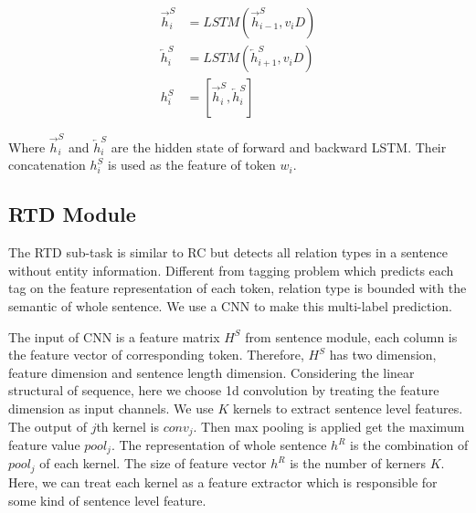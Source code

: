 \begin{align*}
    \overrightarrow{h}_i^S &= LSTM(\overrightarrow{h}_{i-1}^S, v_iD) \nonumber \\
    \overleftarrow{h}_i^S &= LSTM(\overleftarrow{h}_{i+1}^S, v_iD) \nonumber \\
    h_i^S &= [\overrightarrow{h}_i^S, \overleftarrow{h}_i^S] \nonumber
\end{align*}

Where $\overrightarrow{h}_i^S$ and $\overleftarrow{h}_i^S$ are the hidden state
of forward and backward LSTM. Their concatenation $h_i^S$ is used as the feature
of token $w_i$.


%
%
%
%
%
%
%

\subsection{RTD Module}
The RTD sub-task is similar to RC but detects all relation types in a sentence
without entity information. Different from tagging problem which predicts each
tag on the feature representation of each token, relation type is bounded with
the semantic of whole sentence. We use a CNN to make this multi-label
prediction.

The input of CNN is a feature matrix $H^S$ from sentence module, each column is
the feature vector of corresponding token. Therefore, $H^S$ has two dimension, feature
dimension and sentence length dimension. Considering the linear structural of
sequence, here we choose 1d convolution by treating the feature dimension as
input channels. We
use $K$ kernels to extract sentence level features. The output of $j$th kernel
is $conv_j$. Then max pooling is applied  get the maximum feature value
$pool_j$. The representation of whole sentence $h^R$ is the combination of
$pool_j$ of each kernel. The size of feature vector $h^R$ is the number of
kerners $K$. Here, we can treat each kernel as a feature extractor which is
responsible for some kind of sentence level feature.

